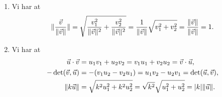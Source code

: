 \begin{enumerate}
	\item Vi har at
	\begin{align*}
	\Vert \frac{\vec{v}}{\Vert \vec{v}\Vert}\Vert=\sqrt{\frac{v_1^2}{\Vert \vec{v}\Vert^2}+\frac{v_2^2}{\Vert \vec{v}\Vert^2}}=\frac{1}{\Vert \vec{v}\Vert}\sqrt{v_1^2+v_2^2}=\frac{\Vert \vec{v}\Vert}{\Vert \vec{v}\Vert}=1.
	\end{align*}
	

	
	\item Vi har at 
	\begin{align*}
	\vec{u}\cdot \vec{v}&=u_1v_1+u_2v_2=v_1u_1+v_2u_2=\vec{v}\cdot \vec{u},\\
	-\det(\vec{v},\vec{u})&=-(v_1u_2-v_2u_1)=u_1v_2-u_2v_1=\det(\vec{u},\vec{v}),\\
	 \Vert k\vec{u}\Vert&=\sqrt{k^2u_1^2+k^2u_2^2}=\sqrt{k^2}\sqrt{u_1^2+u_2^2}=\vert k\vert\Vert \vec{u}\Vert.
	\end{align*}
	

\end{enumerate}